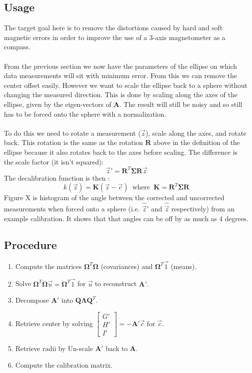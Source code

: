 \documentclass{article}
\def\mat#1{\mathbf{#1}}
\begin{document}
\subsection{Usage}
The target goal here is to remove the distortions caused by hard and soft magnetic errors in order to improve the use of a 3-axis magnetometer as a compass.
\\
\\
From the previous section we now have the parameters of the ellipse on which data measurements 
will sit with minimum error. From this we can remove the center offset easily.
However we want to scale the ellipse back to a sphere without changing the measured direction.
This is done by scaling along the axes of the ellipse, given by the eigen-vectors of $\mat{A}$. The result will still be noisy and so still has to be forced onto the sphere with a normalization.
\\
\\
To do this we need to rotate a measurement ($\vec{z}$), scale along the axes, and rotate back. This rotation is the same as the rotation $\mat{R}$ above in the definition of the ellipse because it also rotates back to the axes before scaling. The difference is the scale factor (it isn't squared):
\begin{equation}
\vec{z}' = \mat{R}^T \mat{\Sigma} \mat{R} \vec{z}
\end{equation}
The decalibration function is then :
\begin{equation}
k(\vec{z}) = \mat{K}\left( \vec{z} - \vec{c} \right)~\text{ where }~\mat{K} = \mat{R}^T \mat{\Sigma} \mat{R}
\end{equation}
Figure X is histogram of the angle between the corrected and uncorrected measurements when forced onto a sphere (i.e. $\hat{\vec{z}}'$ and $\hat{\vec{z}}$ respectively) from an example calibration. It shows that that angles can be off by as much as 4 degrees.
\subsection{Procedure}
\begin{enumerate}
\item Compute the matrices $\mat{\Omega}^T \mat{\Omega}$ (covariances) and $\mat{\Omega}^T \vec{1}$ (means).
\item Solve $\mat{\Omega}^T \mat{\Omega} \vec{u} = \mat{\Omega}^T \vec{1}$ for $\vec{u}$ to reconstruct $\mat{A}'$.
\item Decompose $\mat{A'}$ into $\mat{Q}\mat{\Lambda}\mat{Q}^T$.
\item Retrieve center by solving $\left[\begin{smallmatrix} G'\\H'\\I' \end{smallmatrix}\right] = -\mat{A'}\vec{c}$ for $\vec{c}$.
\item Retrieve radii by Un-scale $\mat{A'}$ back to $\mat{A}$.
\item Compute the calibration matrix.
\end{enumerate}
\end{document}
